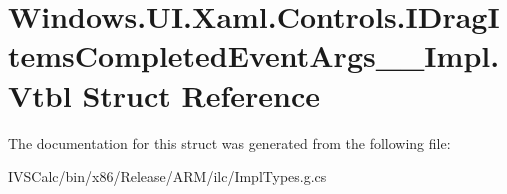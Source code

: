 \hypertarget{struct_windows_1_1_u_i_1_1_xaml_1_1_controls_1_1_i_drag_items_completed_event_args_____impl_1_1_vtbl}{}\section{Windows.\+U\+I.\+Xaml.\+Controls.\+I\+Drag\+Items\+Completed\+Event\+Args\+\_\+\+\_\+\+Impl.\+Vtbl Struct Reference}
\label{struct_windows_1_1_u_i_1_1_xaml_1_1_controls_1_1_i_drag_items_completed_event_args_____impl_1_1_vtbl}


The documentation for this struct was generated from the following file\+:\begin{DoxyCompactItemize}
\item 
I\+V\+S\+Calc/bin/x86/\+Release/\+A\+R\+M/ilc/Impl\+Types.\+g.\+cs\end{DoxyCompactItemize}
